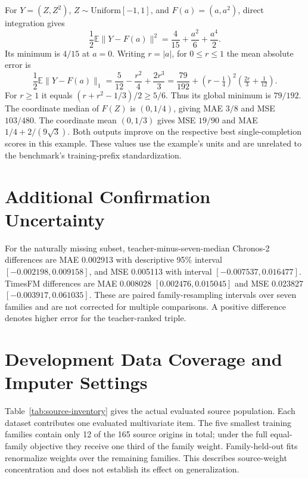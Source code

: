\documentclass{article}
\newcommand{\E}{\mathbb{E}}
\begin{document}
For $Y=(Z,Z^2)$, $Z\sim\mathrm{Uniform}[-1,1]$, and $F(a)=(a,a^2)$, direct integration gives
\begin{equation}
 \frac12\E\|Y-F(a)\|^2=\frac4{15}+\frac{a^2}{6}+\frac{a^4}{2}.
\end{equation}
Its minimum is $4/15$ at $a=0$. Writing $r=|a|$, for $0\le r\le1$ the mean absolute error is
\begin{equation}
 \frac12\E\|Y-F(a)\|_1
 =\frac5{12}-\frac{r^2}{4}+\frac{2r^3}{3}
 =\frac{79}{192}+(r-\tfrac14)^2(\tfrac{2r}{3}+\tfrac1{12}).
\end{equation}
For $r\ge1$ it equals $(r+r^2-1/3)/2\ge5/6$. Thus its global minimum is $79/192$. The coordinate median of $F(Z)$ is $(0,1/4)$, giving MAE $3/8$ and MSE $103/480$. The coordinate mean $(0,1/3)$ gives MSE $19/90$ and MAE $1/4+2/(9\sqrt3)$. Both outputs improve on the respective best single-completion scores in this example. These values use the example's units and are unrelated to the benchmark's training-prefix standardization.

\section{Additional Confirmation Uncertainty}

For the naturally missing subset, teacher-minus-seven-median Chronos-2 differences are MAE 0.002913 with descriptive 95\% interval $[-0.002198,0.009158]$, and MSE 0.005113 with interval $[-0.007537,0.016477]$. TimesFM differences are MAE 0.008028 $[0.002476,0.015045]$ and MSE 0.023827 $[-0.003917,0.061035]$. These are paired family-resampling intervals over seven families and are not corrected for multiple comparisons. A positive difference denotes higher error for the teacher-ranked triple.

\section{Development Data Coverage and Imputer Settings}

Table~\ref{tab:source-inventory} gives the actual evaluated source population. Each dataset contributes one evaluated multivariate item. The five smallest training families contain only 12 of the 165 source origins in total; under the full equal-family objective they receive one third of the family weight. Family-held-out fits renormalize weights over the remaining families. This describes source-weight concentration and does not establish its effect on generalization.
\end{document}
